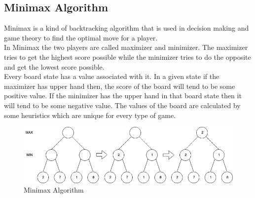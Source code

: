 \documentclass[12pt]{book}
\begin{document}
\subsection{Minimax Algorithm}
\indent Minimax is a kind of backtracking algorithm that is used in decision making and game theory to find the optimal move for a player.\\
\indent In Minimax the two players are called maximizer and minimizer. The maximizer tries to get the highest score possible while the minimizer tries to do the opposite and get the lowest score possible.\\
\indent Every board state has a value associated with it. In a given state if the maximizer has upper hand then, the score of the board will tend to be some positive value. If the minimizer has the upper hand in that board state then it will tend to be some negative value. The values of the board are calculated by some heuristics which are unique for every type of game.
\begin{figure}[ht]
	\centering
	\includegraphics[scale=0.65]{Figure/Figure6_1.png}
	\caption{Minimax Algorithm}
\end{figure}
\end{document}
